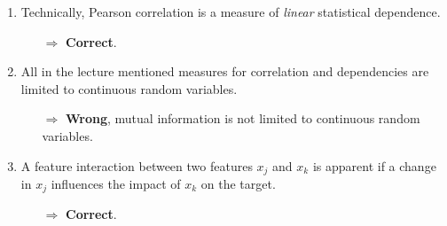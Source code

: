 \begin{enumerate}
        \item Technically, Pearson correlation is a measure of \textit{linear} statistical dependence. 
        \begin{itemize}
        	\item[$\Rightarrow$] \textbf{Correct}.
        \end{itemize}
    	\item All in the lecture mentioned measures for correlation and dependencies are limited to continuous random variables.
    	\begin{itemize}
    		\item[$\Rightarrow$] \textbf{Wrong}, mutual information is not limited to continuous random variables.
    	\end{itemize}
    	\item A feature interaction between two features $x_j$ and $x_k$ is apparent if a change in $x_j$ influences the impact of $x_k$ on the target.
    	\begin{itemize}
    		\item[$\Rightarrow$] \textbf{Correct}.
    	\end{itemize}
	\end{enumerate}
